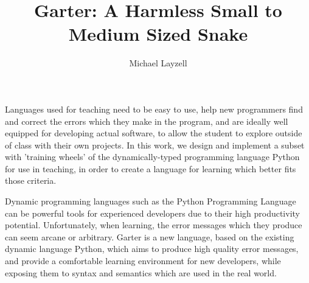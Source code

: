 






\title{Garter: A Harmless Small to Medium Sized Snake}

\author{Michael Layzell}



\beforepreface



Languages used for teaching need to be easy to use, help new programmers find
and correct the errors which they make in the program, and are ideally well
equipped for developing actual software, to allow the student to explore outside
of class with their own projects. In this work, we design and implement
a subset with 'training wheels' of the dynamically-typed programming language
Python \cite{pythonweb} for use in teaching, in order to create a language for
learning which better fits those criteria.

Dynamic programming languages such as the Python Programming Language can be
powerful tools for experienced developers due to their high productivity
potential. Unfortunately, when learning, the error messages which they produce
can seem arcane or arbitrary. Garter is a new language, based on the existing
dynamic language Python, which aims to produce high quality error messages, and
provide a comfortable learning environment for new developers, while exposing
them to syntax and semantics which are used in the real world.


